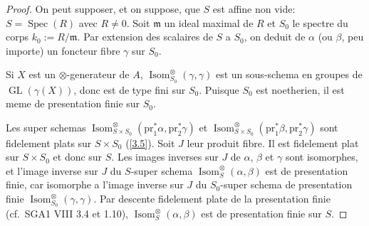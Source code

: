 \documentclass[11pt,a4paper]{article}
\theoremstyle{plain}
\theoremstyle{definition}
\DeclareMathOperator{\Spec}{Spec}
\DeclareMathOperator{\GL}{GL}
\newcommand{\pr}{\mathrm{pr}}
\newcommand{\Isom}{\operatorname{Isom}}
\begin{document}
\begin{proof}
On peut supposer, et on suppose, que $S$ est affine non vide: $S=\Spec(R)$ avec $R\neq0$. Soit $\mathfrak{m}$ un ideal maximal de $R$ et $S_0$ le spectre du corps $k_0:=R/\mathfrak{m}$. Par extension des scalaires de $S$ a $S_0$, on deduit de $\alpha$ (ou $\beta$, peu importe) un foncteur fibre $\gamma$ sur $S_0$.

Si $X$ est un $\otimes$-generateur de $A$, $\Isom^\otimes_{S_0}(\gamma,\gamma)$ est un sous-schema en groupes de $\GL(\gamma(X))$, donc est de type fini sur $S_0$. Puisque $S_0$ est noetherien, il est meme de presentation finie sur $S_0$.

Les super schemas $\Isom^\otimes_{S\times S_0}(\pr_1^*\alpha,\pr_2^*\gamma)$ et $\Isom^\otimes_{S\times S_0}(\pr_1^*\beta,\pr_2^*\gamma)$ sont fidelement plats sur $S\times S_0$ (\ref{3.5}). Soit $J$ leur produit fibre. Il est fidelement plat sur $S\times S_0$ et donc sur $S$. Les images inverses sur $J$ de $\alpha$, $\beta$ et $\gamma$ sont isomorphes, et l'image inverse sur $J$ du $S$-super schema $\Isom^\otimes_S(\alpha,\beta)$ est de presentation finie, car isomorphe a l'image inverse sur $J$ du $S_0$-super schema de presentation finie $\Isom^\otimes_{S_0}(\gamma,\gamma)$. Par descente fidelement plate de la presentation finie (cf.~SGA1 VIII 3.4 et 1.10), $\Isom^\otimes_S(\alpha,\beta)$ est de presentation finie sur $S$.
\end{proof}
\end{document}
